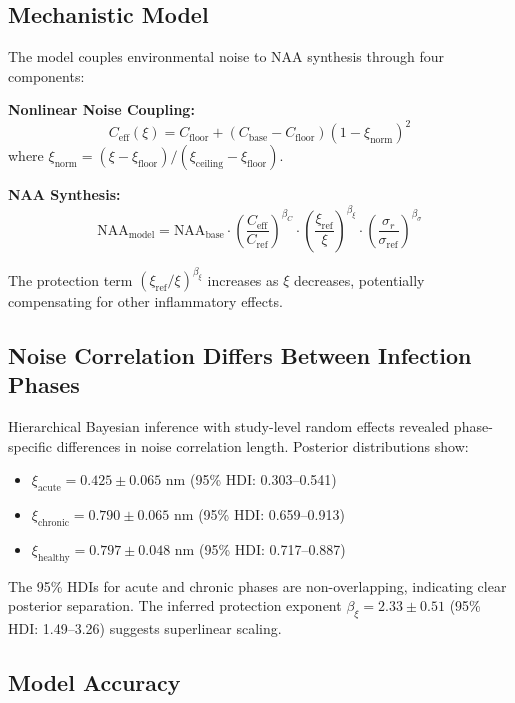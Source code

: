 \documentclass[10pt,a4paper]{article}
\begin{document}
\subsection{Mechanistic Model}

The model couples environmental noise to NAA synthesis through four components:

\textbf{Nonlinear Noise Coupling:}
\begin{equation}
C_{\text{eff}}(\xi) = C_{\text{floor}} + (C_{\text{base}} - C_{\text{floor}})(1 - \xi_{\text{norm}})^2
\end{equation}
where $\xi_{\text{norm}} = (\xi - \xi_{\text{floor}})/(\xi_{\text{ceiling}} - \xi_{\text{floor}})$.

\textbf{NAA Synthesis:}
\begin{equation}
\text{NAA}_{\text{model}} = \text{NAA}_{\text{base}} \cdot \left(\frac{C_{\text{eff}}}{C_{\text{ref}}}\right)^{\beta_C} \cdot \left(\frac{\xi_{\text{ref}}}{\xi}\right)^{\beta_\xi} \cdot \left(\frac{\sigma_r}{\sigma_{\text{ref}}}\right)^{\beta_\sigma}
\end{equation}

The protection term $(\xi_{\text{ref}}/\xi)^{\beta_\xi}$ increases as $\xi$ decreases, potentially compensating for other inflammatory effects.

\subsection{Noise Correlation Differs Between Infection Phases}

Hierarchical Bayesian inference with study-level random effects revealed phase-specific differences in noise correlation length. Posterior distributions show:

\begin{itemize}
\item $\xi_{\text{acute}} = 0.425 \pm 0.065$ nm (95\% HDI: 0.303--0.541)
\item $\xi_{\text{chronic}} = 0.790 \pm 0.065$ nm (95\% HDI: 0.659--0.913)
\item $\xi_{\text{healthy}} = 0.797 \pm 0.048$ nm (95\% HDI: 0.717--0.887)
\end{itemize}

The 95\% HDIs for acute and chronic phases are non-overlapping, indicating clear posterior separation. The inferred protection exponent $\beta_\xi = 2.33 \pm 0.51$ (95\% HDI: 1.49--3.26) suggests superlinear scaling.

\subsection{Model Accuracy}
\end{document}
